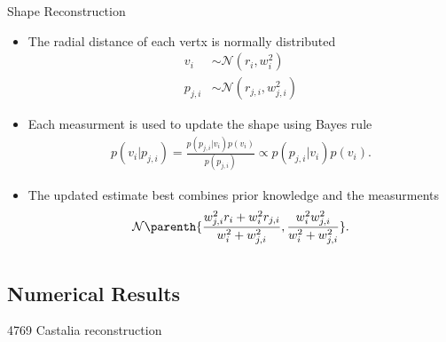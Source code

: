 \documentclass[11pt,professionalfonts]{beamer}
\begin{document}
\begin{frame}{Shape Reconstruction}
    \begin{itemize}
        \item The radial distance of each vertx is normally distributed
            \begin{align*}
                v_i &\sim \mathcal{N}(r_i, w_i^2) \\
                p_{j,i} &\sim \mathcal{N}(r_{j,i}, w_{j,i}^2)
            \end{align*}
        \item Each measurment is used to update the shape using Bayes rule 
            \begin{align}
                p(v_i | p_{j, i}) = \frac{p(p_{j, i} | v_i) p(v_i)}{p( p_{j, i})} \propto p(p_{j,i} | v_i) p(v_i).
            \end{align}
        \item The updated estimate best combines prior knowledge and the measurments
    \begin{align}\label{eq:posterior_probability}
        \mathcal{N} \parenth{\frac{w_{j, i}^2 r_i + w_i^2 r_{j, i}}{w_i^2 + w_{j, i}^2} , \frac{w_i^2  w_{j, i}^2}{w_i^2 +  w_{j, i}^2}} .
    \end{align}
    \end{itemize}
\end{frame}

\section*{}
\subsection*{Numerical Results}

\begin{frame}{4769 Castalia reconstruction}
    \begin{center}
\end{center}
\end{frame}
\end{document}
